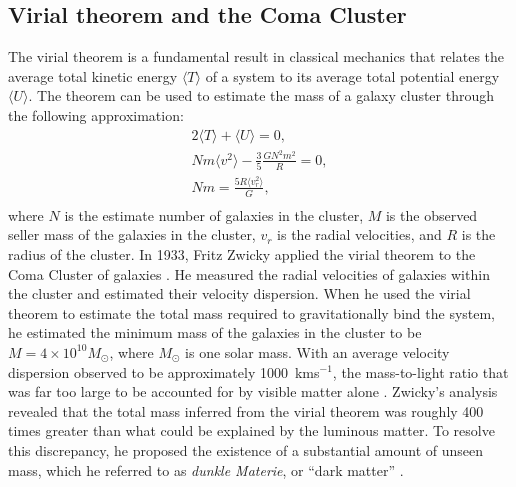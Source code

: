 \subsection{Virial theorem and the Coma Cluster}\label{sec:DMOverview/ViralTheorem}
The virial theorem is a fundamental result in classical mechanics that relates the average total kinetic energy $\langle T \rangle$ of a system to its average total potential energy $\langle U \rangle$. The theorem can be used to estimate the mass of a galaxy cluster through the following approximation:
\begin{equation}
\begin{split}
2\langle T \rangle + \langle U \rangle = 0, \\
Nm\langle v^2\rangle - \frac{3}{5}\frac{GN^2m^2}{R}=0,\\
Nm=\frac{5R\langle v_r^2 \rangle}{G},\\
\end{split}
\label{eq:DMOverview/virial}
\end{equation}
where $N$ is the estimate number of galaxies in the cluster, $M$ is the observed seller mass of the galaxies in the cluster, $v_r$ is the radial velocities, and $R$ is the radius of the cluster.
In 1933, Fritz Zwicky applied the virial theorem to the Coma Cluster of galaxies \cite{Zwicky1933}. He measured the radial velocities of galaxies within the cluster and estimated their velocity dispersion. When he used the virial theorem to estimate the total mass required to gravitationally bind the system, he estimated the minimum mass of the galaxies in the cluster to be $M=4\times 10^{10}M_{\odot}$, where $M_{\odot}$ is one solar mass. With an average velocity dispersion observed to be approximately 1000~kms$^{-1}$, the mass-to-light ratio that was far too large to be accounted for by visible matter alone \cite{HistoryofDM}. Zwicky’s analysis revealed that the total mass inferred from the virial theorem was roughly 400 times greater than what could be explained by the luminous matter. To resolve this discrepancy, he proposed the existence of a substantial amount of unseen mass, which he referred to as \textit{dunkle Materie}, or “dark matter” \cite{Zwicky1933}.

